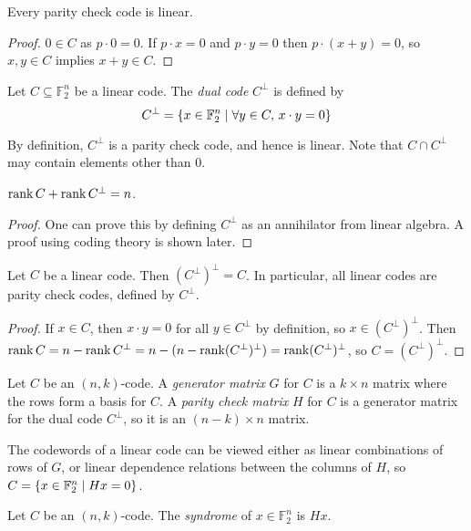 \begin{lemma}
    Every parity check code is linear.
\end{lemma}
\begin{proof}
    \( 0 \in C \) as \( p \cdot 0 = 0 \).
    If \( p \cdot x = 0 \) and \( p \cdot y = 0 \) then \( p \cdot (x + y) = 0 \), so \( x, y \in C \) implies \( x + y \in C \).
\end{proof}
\begin{definition}
    Let \( C \subseteq \mathbb F_2^n \) be a linear code.
    The \emph{dual code} \( C^\perp \) is defined by
    \[ C^\perp = \qty{x \in \mathbb F_2^n \mid \forall y \in C,\, x \cdot y = 0} \]
\end{definition}
By definition, \( C^\perp \) is a parity check code, and hence is linear.
Note that \( C \cap C^\perp \) may contain elements other than 0.
\begin{lemma}
    \( \rank C + \rank C^\perp = n \).
\end{lemma}
\begin{proof}
    One can prove this by defining \( C^\perp \) as an annihilator from linear algebra.
    A proof using coding theory is shown later.
\end{proof}
\begin{corollary}
    Let \( C \) be a linear code.
    Then \( (C^\perp)^\perp = C \).
    In particular, all linear codes are parity check codes, defined by \( C^\perp \).
\end{corollary}
\begin{proof}
    If \( x \in C \), then \( x \cdot y = 0 \) for all \( y \in C^\perp \) by definition, so \( x \in (C^\perp)^\perp \).
    Then \( \rank C = n - \rank C^\perp = n - (n - \rank (C^\perp)^\perp) = \rank (C^\perp)^\perp \), so \( C = (C^\perp)^\perp \).
\end{proof}
\begin{definition}
    Let \( C \) be an \( (n,k) \)-code.
    A \emph{generator matrix} \( G \) for \( C \) is a \( k \times n \) matrix where the rows form a basis for \( C \).
    A \emph{parity check matrix} \( H \) for \( C \) is a generator matrix for the dual code \( C^\perp \), so it is an \( (n-k) \times n \) matrix.
\end{definition}
The codewords of a linear code can be viewed either as linear combinations of rows of \( G \), or linear dependence relations between the columns of \( H \), so \( C = \qty{x \in \mathbb F_2^n \mid H x = 0} \).
\begin{definition}
    Let \( C \) be an \( (n, k) \)-code.
    The \emph{syndrome} of \( x \in \mathbb F_2^n \) is \( Hx \).
\end{definition}
